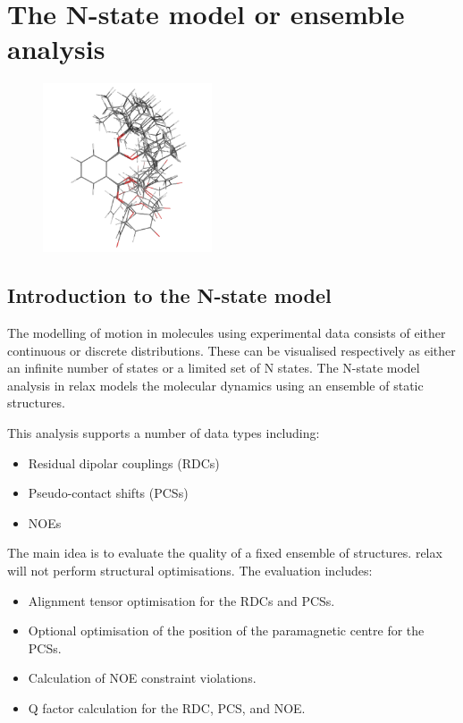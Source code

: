 
\chapter{The N-state model or ensemble analysis} \label{ch: N-state model}


\begin{figure}[h]
  \includegraphics[width=5cm, bb=0 0 1701 1701]{graphics/misc/n_state_model/phthalic_acid_ens_600x600}
\end{figure}



\section{Introduction to the N-state model}

The modelling of motion in molecules using experimental data consists of either continuous or discrete distributions.
These can be visualised respectively as either an infinite number of states or a limited set of N states.
The N-state model analysis in relax models the molecular dynamics using an ensemble of static structures.

This analysis supports a number of data types including:
\begin{itemize}
\item Residual dipolar couplings (RDCs)
\item Pseudo-contact shifts (PCSs)
\item NOEs
\end{itemize}

The main idea is to evaluate the quality of a fixed ensemble of structures.
relax will not perform structural optimisations.
The evaluation includes:
\begin{itemize}
\item Alignment tensor optimisation for the RDCs and PCSs.
\item Optional optimisation of the position of the paramagnetic centre for the PCSs.
\item Calculation of NOE constraint violations.
\item Q factor calculation for the RDC, PCS, and NOE.
\end{itemize}


